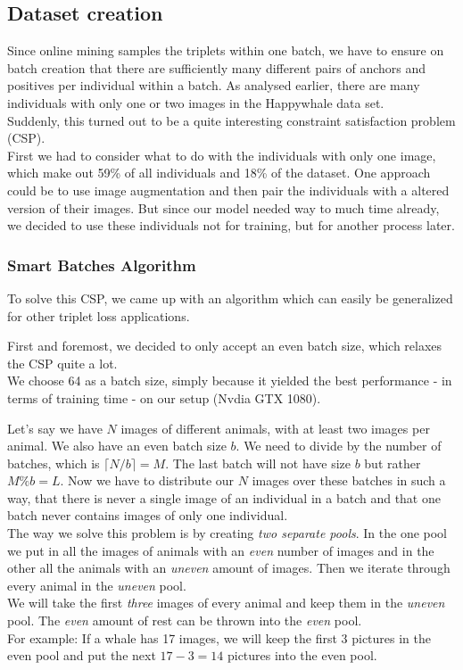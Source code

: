\subsection{Dataset creation}
Since online mining samples the triplets within one batch, we have to ensure on batch creation that there are sufficiently many different pairs of anchors and positives per individual within a batch. As analysed earlier, there are many individuals with only one or two images in the Happywhale data set. \\
Suddenly, this turned out to be a quite interesting constraint satisfaction problem (CSP).\\
First we had to consider what to do with the individuals with only one image, which make out 59\% of all individuals and 18\% of the dataset. One approach could be to use image augmentation and then pair the individuals with a altered version of their images. But since our model needed way to much time already, we decided to use these individuals not for training, but for another process later.

\subsubsection{Smart Batches Algorithm}
\label{subsubsec:smart-batches}
To solve this CSP, we came up with an algorithm which can easily be generalized for other triplet loss applications.

\noindent First and foremost, we decided to only accept an even batch size, which relaxes the CSP quite a lot. \\
We choose 64 as a batch size, simply because it yielded the best performance - in terms of training time - on our setup (Nvdia GTX 1080).

\noindent Let's say we have $N$ images of different animals, with at least two images per animal. We also have an even batch size $b$. We need to divide by the number of batches, which is $\lceil N/b \rceil = M$. The last batch will not have size $b$ but rather $M\%b=L$. Now we have to distribute our $N$ images over these batches in such a way, that there is never a single image of an individual in a batch and that one batch never contains images of only one individual.\\ 

\noindent The way we solve this problem is by creating \textit{two separate pools}. In the one pool we put in all the images of animals with an \textit{even} number of images and in the other all the animals with an \textit{uneven} amount of images. Then we iterate through every animal in the \textit{uneven} pool. \\
We will take the first \textit{three} images of every animal and keep them in the \textit{uneven} pool. The \textit{even} amount of rest can be thrown into the \textit{even} pool. \\
For example: If a whale has 17 images, we will keep the first $3$ pictures in the even pool and put the next $17-3=14$ pictures into the even pool. \\

